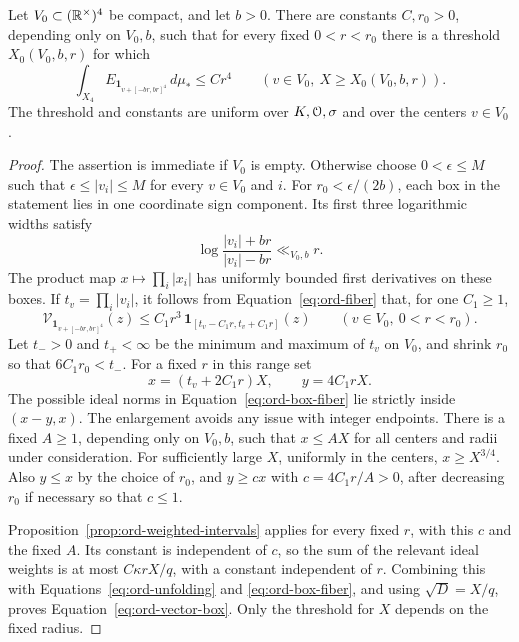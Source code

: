 \begin{lemma}\label{lem:ord-boxes}
Let \(V_0\subset(\mathbb R^\times)^4\) be compact, and let \(b>0\).
There are constants \(C,r_0>0\), depending only on \(V_0,b\), such
that for every fixed \(0<r<r_0\) there is a threshold
\(X_0(V_0,b,r)\) for which
\begin{equation}\label{eq:ord-vector-box}
 \int_{X_4}E_{\mathbf 1_{v+[-br,br]^4}}\,d\mu_*
       \le Cr^4\qquad(v\in V_0,\ X\ge X_0(V_0,b,r)).
\end{equation}
The threshold and constants are uniform over \(K,\mathcal O,\sigma\) and
over the centers \(v\in V_0\).
\end{lemma}

\begin{proof}
The assertion is immediate if \(V_0\) is empty.  Otherwise choose
\(0<\epsilon\le M\) such that
\(\epsilon\le|v_i|\le M\) for every \(v\in V_0\) and \(i\).
For \(r_0<\epsilon/(2b)\), each box in the statement lies in one
coordinate sign component.  Its first three logarithmic widths satisfy
\[
 \log\frac{|v_i|+br}{|v_i|-br}\ll_{V_0,b}r .
\]
The product map \(x\mapsto\prod_i|x_i|\) has uniformly bounded first
derivatives on these boxes.  If \(t_v=\prod_i|v_i|\), it follows
from Equation~\eqref{eq:ord-fiber} that, for one \(C_1\ge1\),
\begin{equation}\label{eq:ord-box-fiber}
 \mathcal V_{\mathbf 1_{v+[-br,br]^4}}(z)
       \le C_1r^3\,\mathbf 1_{[t_v-C_1r,t_v+C_1r]}(z)
       \qquad(v\in V_0,\ 0<r<r_0).
\end{equation}
Let \(t_->0\) and \(t_+<\infty\) be the minimum and maximum of \(t_v\)
on \(V_0\), and shrink \(r_0\) so that \(6C_1r_0<t_-\).
For a fixed \(r\) in this range set
\[
 x=(t_v+2C_1r)X,\qquad y=4C_1rX.
\]
The possible ideal norms in Equation~\eqref{eq:ord-box-fiber} lie
strictly inside \((x-y,x)\).  The enlargement avoids any issue with
integer endpoints.  There is a fixed \(A\ge1\), depending only on
\(V_0,b\), such that \(x\le AX\) for all centers and radii under
consideration.  For sufficiently large \(X\), uniformly in the
centers, \(x\ge X^{3/4}\).  Also \(y\le x\) by the choice of \(r_0\),
and \(y\ge cx\) with \(c=4C_1r/A>0\), after decreasing \(r_0\) if
necessary so that \(c\le1\).

Proposition~\ref{prop:ord-weighted-intervals} applies for every fixed
\(r\), with this \(c\) and the fixed \(A\).  Its constant is independent
of \(c\), so the sum of the relevant ideal weights is at most
\(C\kappa rX/q\), with a constant independent of \(r\).  Combining
this with Equations~\eqref{eq:ord-unfolding} and
\eqref{eq:ord-box-fiber}, and using \(\sqrt D=X/q\), proves
Equation~\eqref{eq:ord-vector-box}.  Only the threshold for \(X\)
depends on the fixed radius.
\end{proof}

